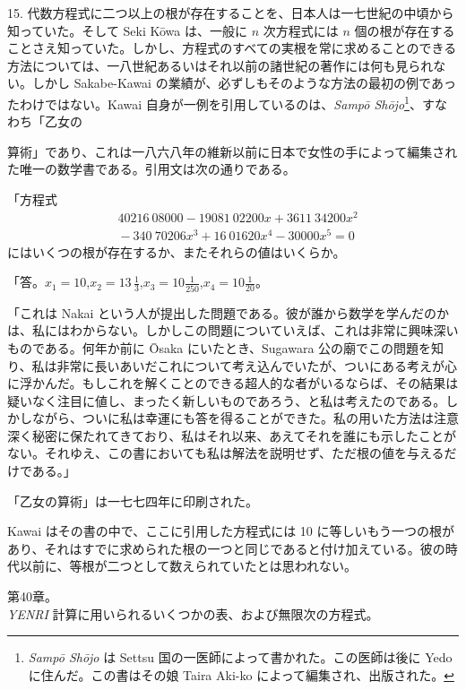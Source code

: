 \documentclass[11pt]{article}
\newcommand{\scanpage}[2]{\clearpage\setcounter{footnote}{0}\noindent{\footnotesize\color{gray}PDF #1 頁 · #2}\par\medskip}
\begin{document}
15. 代数方程式に二つ以上の根が存在することを、日本人は一七世紀の中頃から知っていた。そして Seki Kōwa は、一般に $n$ 次方程式には $n$ 個の根が存在することさえ知っていた。しかし、方程式のすべての実根を常に求めることのできる方法については、一八世紀あるいはそれ以前の諸世紀の著作には何も見られない。しかし Sakabe-Kawai の業績が、必ずしもそのような方法の最初の例であったわけではない。Kawai 自身が一例を引用しているのは、\emph{Sampō Shōjo}\footnote{\emph{Sampō Shōjo} は Settsu 国の一医師によって書かれた。この医師は後に Yedo に住んだ。この書はその娘 Taira Aki-ko によって編集され、出版された。}、すなわち「乙女の

\scanpage{0282}{印刷頁 268}
\noindent 算術」であり、これは一八六八年の維新以前に日本で女性の手によって編集された唯一の数学書である。引用文は次の通りである。

「方程式
\[
\begin{aligned}
&40216\ 08000 - 19081\ 02200x + 3611\ 34200x^2\\
&{}- 340\ 70206x^3 + 16\ 01620x^4 - 30000x^5 = 0
\end{aligned}
\]
にはいくつの根が存在するか、またそれらの値はいくらか。

「答。\quad $x_1 = 10$,\quad $x_2 = 13\,\frac{1}{3}$,\quad $x_3 = 10\frac{1}{250}$,\quad $x_4 = 10\frac{1}{20}$。

「これは Nakai という人が提出した問題である。彼が誰から数学を学んだのかは、私にはわからない。しかしこの問題についていえば、これは非常に興味深いものである。何年か前に Ōsaka にいたとき、Sugawara 公の廟でこの問題を知り、私は非常に長いあいだこれについて考え込んでいたが、ついにある考えが心に浮かんだ。もしこれを解くことのできる超人的な者がいるならば、その結果は疑いなく注目に値し、まったく新しいものであろう、と私は考えたのである。しかしながら、ついに私は幸運にも答を得ることができた。私の用いた方法は注意深く秘密に保たれてきており、私はそれ以来、あえてそれを誰にも示したことがない。それゆえ、この書においても私は解法を説明せず、ただ根の値を与えるだけである。」

「乙女の算術」は一七七四年に印刷された。

Kawai はその書の中で、ここに引用した方程式には 10 に等しいもう一つの根があり、それはすでに求められた根の一つと同じであると付け加えている。彼の時代以前に、等根が二つとして数えられていたとは思われない。

\begin{center}
第40章。\\[1mm]
\emph{YENRI} 計算に用いられるいくつかの表、および無限次の方程式。
\end{center}
\end{document}
